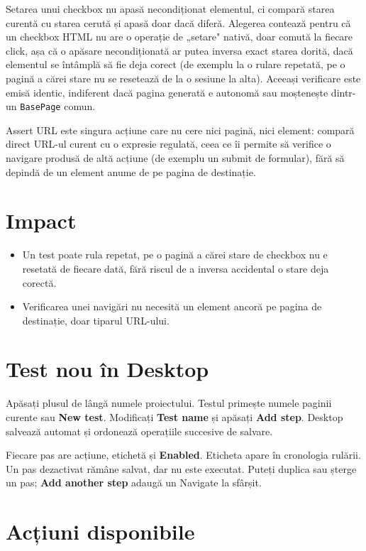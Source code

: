 \documentclass[12pt,a4paper]{report}
\newcommand{\UI}[1]{\textbf{#1}}
\newcommand{\File}[1]{\nolinkurl{#1}}
\begin{document}
Setarea unui checkbox nu apasă necondiționat elementul, ci compară starea curentă cu starea cerută și apasă doar dacă diferă. Alegerea contează pentru că un checkbox HTML nu are o operație de „setare" nativă, doar comută la fiecare click, așa că o apăsare necondiționată ar putea inversa exact starea dorită, dacă elementul se întâmplă să fie deja corect (de exemplu la o rulare repetată, pe o pagină a cărei stare nu se resetează de la o sesiune la alta). Aceeași verificare este emisă identic, indiferent dacă pagina generată e autonomă sau moștenește dintr-un \File{BasePage} comun.

Assert URL este singura acțiune care nu cere nici pagină, nici element: compară direct URL-ul curent cu o expresie regulată, ceea ce îi permite să verifice o navigare produsă de altă acțiune (de exemplu un submit de formular), fără să depindă de un element anume de pe pagina de destinație.

\section{Impact}

\begin{itemize}
  \item Un test poate rula repetat, pe o pagină a cărei stare de checkbox nu e resetată de fiecare dată, fără riscul de a inversa accidental o stare deja corectă.
  \item Verificarea unei navigări nu necesită un element ancoră pe pagina de destinație, doar tiparul URL-ului.
\end{itemize}

\section{Test nou în Desktop}

Apăsați plusul de lângă numele proiectului. Testul primește numele paginii curente sau \UI{New test}. Modificați \UI{Test name} și apăsați \UI{Add step}. Desktop salvează automat și ordonează operațiile succesive de salvare.

Fiecare pas are acțiune, etichetă și \UI{Enabled}. Eticheta apare în cronologia rulării. Un pas dezactivat rămâne salvat, dar nu este executat. Puteți duplica sau șterge un pas; \UI{Add another step} adaugă un Navigate la sfârșit.

\section{Acțiuni disponibile}
\end{document}
